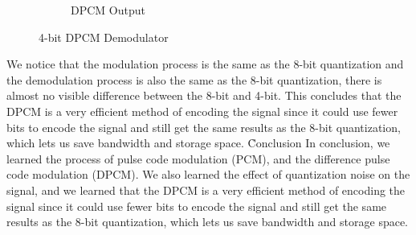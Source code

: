 \documentclass[12pt]{article}
\begin{document}
\begin{figure}[H]
\begin{subfigure}[b]{0.32\textwidth}
        \caption{DPCM Output}
    \end{subfigure}
    \caption{4-bit DPCM Demodulator}
\end{figure}
We notice that the modulation process is the same as the 8-bit quantization and the demodulation process is also the same as the 8-bit quantization, there is almost no visible difference between the 8-bit and 4-bit. This concludes that the DPCM is a very efficient method of encoding the signal since it could use fewer bits to encode the signal and still get the same results as the 8-bit quantization, which lets us save bandwidth and storage space.
\clearpage
\h{Conclusion}
In conclusion, we learned the process of pulse code modulation (PCM), and the difference pulse code modulation (DPCM). We also learned the effect of quantization noise on the signal, and we learned that the DPCM is a very efficient method of encoding the signal since it could use fewer bits to encode the signal and still get the same results as the 8-bit quantization, which lets us save bandwidth and storage space.
\clearpage


\clearpage
\end{document}
